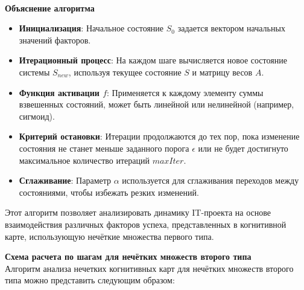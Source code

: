 \documentclass{article}
\begin{document}
    ~\\
    \textbf{Объяснение алгоритма}
    \begin{itemize}
        \item \textbf{Инициализация}: Начальное состояние $S_0$ задается вектором начальных значений факторов.
        \item \textbf{Итерационный процесс}: На каждом шаге вычисляется новое состояние системы $S_{new}$, используя текущее состояние $S$ и матрицу весов $A$.
        \item \textbf{Функция активации $f$}: Применяется к каждому элементу суммы взвешенных состояний, может быть линейной или нелинейной (например, сигмоид).
        \item \textbf{Критерий остановки}: Итерации продолжаются до тех пор, пока изменение состояния не станет меньше заданного порога $\epsilon$ или не будет достигнуто максимальное количество итераций $maxIter$.
        \item \textbf{Сглаживание}: Параметр $\alpha$ используется для сглаживания переходов между состояниями, чтобы избежать резких изменений.
    \end{itemize}
    Этот алгоритм позволяет анализировать динамику IT-проекта на основе взаимодействия различных факторов успеха, представленных в когнитивной карте, использующую нечёткие множества первого типа.

    \textbf{Схема расчета по шагам для нечётких множеств второго типа}\\
    Алгоритм анализа нечетких когнитивных карт для нечётких множеств второго типа можно представить следующим образом:
\end{document}
